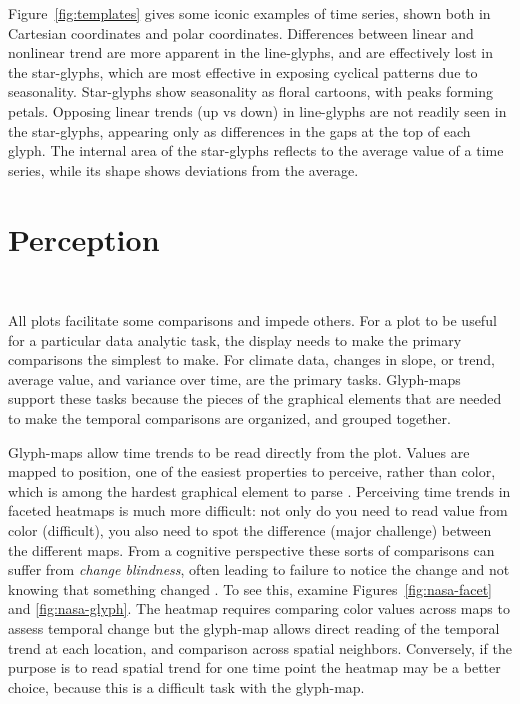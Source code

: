 \documentclass[oneside]{article}
\begin{document}
Figure~\ref{fig:templates} gives some iconic examples of time series, shown both in Cartesian coordinates and polar coordinates. Differences between linear and nonlinear trend are more apparent in the line-glyphs, and are effectively lost in the star-glyphs, which are most effective in exposing cyclical patterns due to seasonality. Star-glyphs show seasonality as floral cartoons, with peaks forming petals. Opposing linear trends (up vs down) in line-glyphs are not readily seen in the star-glyphs, appearing only as differences in the gaps at the top of each glyph. The internal area of the star-glyphs reflects to the average value of a time series, while its shape shows deviations from the average.

\section{Perception}~\label{sec:perception}

All plots facilitate some comparisons and impede others. For a plot to be useful for a particular data analytic task, the display needs to make the primary comparisons the simplest to make. For climate data, changes in slope, or trend, average value, and variance over time, are the primary tasks. Glyph-maps support these tasks because the pieces of the graphical elements that are needed to make the temporal comparisons are organized, and grouped together.

Glyph-maps allow time trends to be read directly from the plot. Values are mapped to position, one of the easiest properties to perceive, rather than color, which is among the hardest graphical element to parse \citep{cleveland:1984}. Perceiving time trends in faceted heatmaps is much more difficult: not only do you need to read value from color (difficult), you also need to spot the difference (major challenge) between the different maps. From a cognitive perspective these sorts of comparisons can suffer from \emph{change blindness}, often leading to failure to notice the change and not knowing that something changed \citep{healey:2011,busey}. To see this, examine Figures~\ref{fig:nasa-facet} and \ref{fig:nasa-glyph}. The heatmap requires comparing color values across maps to assess temporal change but the glyph-map allows direct reading of the temporal trend at each location, and comparison across spatial neighbors. Conversely, if the purpose is to read spatial trend for one time point the heatmap may be a better choice, because this is a difficult task with the glyph-map. 
\end{document}
